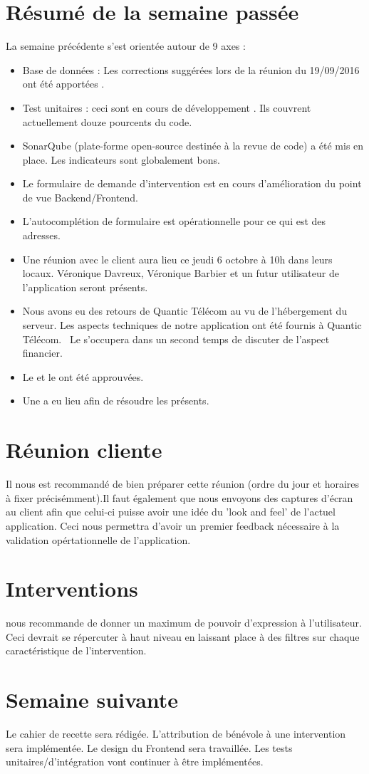 \documentclass [a4paper] {article}
\begin{document}
\section{Résumé de la semaine passée}
La semaine précédente s'est orientée autour de 9 axes :  
\begin{itemize}
\item Base de données : Les corrections suggérées lors de la réunion du 19/09/2016 ont été apportées .
\item Test unitaires : ceci sont en cours de développement . Ils couvrent actuellement douze pourcents du code.
\item SonarQube (plate-forme open-source destinée à la revue de code) a été mis en place. Les indicateurs sont globalement bons. 
\item Le formulaire de demande d'intervention est en cours d'amélioration du point de vue Backend/Frontend.
\item L'autocomplétion de formulaire est opérationnelle pour ce qui est des adresses.
\item Une réunion avec le client aura lieu ce jeudi 6 octobre à 10h dans leurs locaux. Véronique Davreux, Véronique Barbier et un futur utilisateur de l'application seront présents.
\item Nous avons eu des retours de Quantic Télécom au vu de l'hébergement du serveur. Les aspects techniques de notre application ont été fournis à Quantic Télécom. \ Le \CP{} s'occupera dans un second temps de discuter de l'aspect financier. 
\item Le \PQ{} et le \PGC{} ont été approuvées.
\item Une \CTFT{} a eu lieu afin de résoudre les \FT{} présents.
\end{itemize} 

\section{Réunion cliente}
Il nous est recommandé de bien préparer cette réunion (ordre du jour et horaires à fixer précisémment).Il faut également que nous envoyons des captures d'écran au client afin que celui-ci puisse avoir une idée du 'look and feel' de l'actuel application. Ceci nous permettra d'avoir un premier feedback nécessaire à la validation opértationnelle de l'application.

\section{Interventions}
\nomTuteurPedago{} nous recommande de donner un maximum de pouvoir d'expression à l'utilisateur. Ceci devrait se répercuter à haut niveau en laissant place à des filtres sur chaque caractéristique de l'intervention. 

\section{Semaine suivante}
Le cahier de recette sera rédigée. L'attribution de bénévole à une intervention sera implémentée. Le design du Frontend sera travaillée. Les tests unitaires/d'intégration vont continuer à être implémentées.


\newpage
\end{document}
